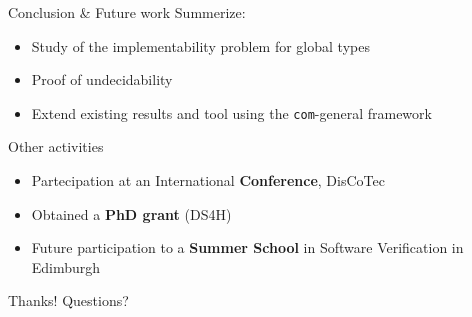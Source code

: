 \documentclass{beamer}
\begin{document}
\begin{frame}[fragile]{Conclusion \& Future work}
	Summerize:

	\bigskip

	\begin{itemize}
		\item Study of the implementability problem for global types

		      \bigskip

		\item Proof of undecidability

		      \bigskip

		\item Extend existing results and tool using the \verb|com|-general framework
	\end{itemize}
\end{frame}

\begin{frame}{Other activities}
	\begin{itemize}
		\item Partecipation at an International \textbf{Conference}, DisCoTec
		\item Obtained a \textbf{PhD grant} (DS4H)
		\item Future participation to a \textbf{Summer School} in Software Verification in Edimburgh
	\end{itemize}
	\bigskip
	\begin{center}
		\Large Thanks! Questions?
	\end{center}
\end{frame}

\end{document}
